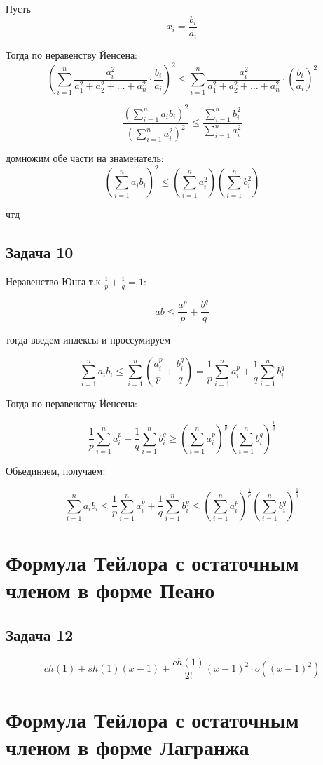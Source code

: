 \documentclass[a4paper,12pt]{article}
\begin{document}
Пусть
\[
x_i = \frac{b_i}{a_i}
\]

Тогда по неравенству Йенсена: 
\[
\left( \sum_{i=1}^n \frac{a_i^2}{a_1^2 + a_2^2 + \dots + a_n^2} \cdot \frac{b_i}{a_i} \right)^2 \leq \sum_{i=1}^n \frac{a_i^2}{a_1^2 + a_2^2 + \dots + a_n^2} \cdot \left( \frac{b_i}{a_i} \right)^2
\]

\[
\frac{\left( \sum_{i=1}^n a_i b_i \right)^2}{\left( \sum_{i=1}^n a_i^2 \right)^2} \leq \frac{\sum_{i=1}^n b_i^2}{\sum_{i=1}^n a_i^2}
\]

домножим обе части на знаменатель:
\[
\left( \sum_{i=1}^n a_i b_i \right)^2 \leq \left( \sum_{i=1}^n a_i^2 \right) \left( \sum_{i=1}^n b_i^2 \right)
\]

чтд

\subsection{Задача 10}
Неравенство Юнга т.к $\frac{1}{p} + \frac{1}{q} = 1$:

\[
ab \le \frac{a^p}{p} + \frac{b^q}{q}
\]

тогда введем индексы и проссумируем

\[
\sum_{i=1}^{n} a_i b_i \leq \sum_{i=1}^{n} \left( \frac{a_i^{p}}{p} + \frac{b_i^{q}}{q} \right) = \frac{1}{p} \sum_{i=1}^{n} a_i^{p} + \frac{1}{q} \sum_{i=1}^{n} b_i^{q}
\]

Тогда по неравенству Йенсена:

\[
\frac{1}{p} \sum_{i=1}^{n} a_i^{p} + \frac{1}{q} \sum_{i=1}^{n} b_i^{q} \geq \left( \sum_{i=1}^{n} a_i^{p} \right)^{\frac{1}{p}} \left( \sum_{i=1}^{n} b_i^{q} \right)^{\frac{1}{q}}
\]

Обьединяем, получаем:

\[
    \sum_{i=1}^{n} a_i b_i \leq \frac{1}{p} \sum_{i=1}^{n} a_i^{p} + \frac{1}{q} \sum_{i=1}^{n} b_i^{q} \leq \left( \sum_{i=1}^{n} a_i^{p} \right)^{\frac{1}{p}} \left( \sum_{i=1}^{n} b_i^{q} \right)^{\frac{1}{q}}
\]

\section{Формула Тейлора с остаточным членом в форме Пеано}
\subsection{Задача 12}

\[
ch(1) + sh(1)(x-1) + \frac{ch(1)}{2!}(x-1)^2\cdot o((x-1)^2)
\]

\section{Формула Тейлора с остаточным членом в форме Лагранжа}
\end{document}
